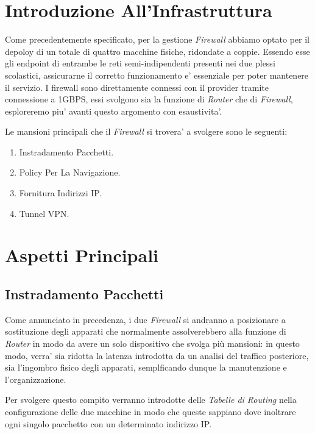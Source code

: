 \documentclass{report}
\begin{document}
		\section{Introduzione All'Infrastruttura}
			Come precedentemente specificato, per la gestione \emph{Firewall} abbiamo optato per il depoloy di un totale di
			quattro macchine fisiche, ridondate a coppie. Essendo esse gli endpoint di entrambe le reti semi-indipendenti 
			presenti nei due plessi scolastici, assicurarne il corretto funzionamento e' essenziale per poter mantenere
			il servizio.
			I firewall sono direttamente connessi con il provider tramite connessione a 1GBPS, essi svolgono sia la funzione 
			di \emph{Router} che di \emph{Firewall}, esploreremo piu' avanti questo argomento con esaustivita'.

			Le mansioni principali che il \emph{Firewall} si trovera' a svolgere sono le seguenti:
			\begin{enumerate}
				\item Instradamento Pacchetti.
				\item Policy Per La Navigazione.
				\item Fornitura Indirizzi IP.
				\item Tunnel VPN.
			\end{enumerate}
		\section{Aspetti Principali}
			\subsection{Instradamento Pacchetti}
				Come annunciato in precedenza, i due \emph{Firewall} si andranno a posizionare a sostituzione degli apparati
				che normalmente assolverebbero alla funzione di \emph{Router} in modo da avere un solo dispositivo che svolga
				più mansioni: in questo modo, verra' sia ridotta la latenza introdotta da un analisi del traffico posteriore,
				sia l'ingombro fisico degli apparati, semplficando dunque la manutenzione e l'organizzazione.

				Per svolgere questo compito verranno introdotte delle \emph{Tabelle di Routing} nella configurazione delle due
				macchine in modo che queste sappiano dove inoltrare ogni singolo pacchetto con un determinato indirizzo IP.
\end{document}
